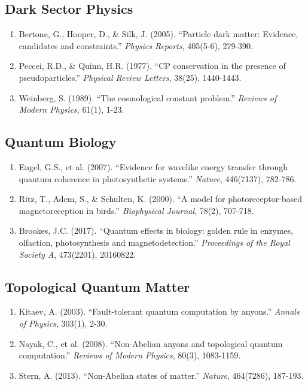 \documentclass[11pt,a4paper,twoside]{article}
\begin{document}
\subsection{Dark Sector Physics}

\begin{enumerate}[leftmargin=*,start=8]
    \item Bertone, G., Hooper, D., \& Silk, J. (2005). ``Particle dark matter: Evidence, candidates and constraints.'' \textit{Physics Reports}, 405(5-6), 279-390.

    \item Peccei, R.D., \& Quinn, H.R. (1977). ``CP conservation in the presence of pseudoparticles.'' \textit{Physical Review Letters}, 38(25), 1440-1443.

    \item Weinberg, S. (1989). ``The cosmological constant problem.'' \textit{Reviews of Modern Physics}, 61(1), 1-23.
\end{enumerate}

\subsection{Quantum Biology}

\begin{enumerate}[leftmargin=*,start=11]
    \item Engel, G.S., et al. (2007). ``Evidence for wavelike energy transfer through quantum coherence in photosynthetic systems.'' \textit{Nature}, 446(7137), 782-786.

    \item Ritz, T., Adem, S., \& Schulten, K. (2000). ``A model for photoreceptor-based magnetoreception in birds.'' \textit{Biophysical Journal}, 78(2), 707-718.

    \item Brookes, J.C. (2017). ``Quantum effects in biology: golden rule in enzymes, olfaction, photosynthesis and magnetodetection.'' \textit{Proceedings of the Royal Society A}, 473(2201), 20160822.
\end{enumerate}

\subsection{Topological Quantum Matter}

\begin{enumerate}[leftmargin=*,start=14]
    \item Kitaev, A. (2003). ``Fault-tolerant quantum computation by anyons.'' \textit{Annals of Physics}, 303(1), 2-30.

    \item Nayak, C., et al. (2008). ``Non-Abelian anyons and topological quantum computation.'' \textit{Reviews of Modern Physics}, 80(3), 1083-1159.

    \item Stern, A. (2013). ``Non-Abelian states of matter.'' \textit{Nature}, 464(7286), 187-193.
\end{enumerate}
\end{document}

